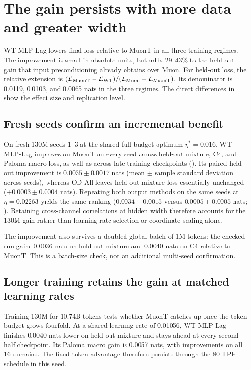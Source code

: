 \section{The gain persists with more data and greater width}
\label{sec:scaling}

WT-MLP-Lag lowers final loss relative to MuonT in all three training regimes. The improvement is small in absolute units, but adds 29--43\% to the held-out gain that input preconditioning already obtains over Muon. For held-out loss, the relative extension is $(\mathcal L_{\rm MuonT}-\mathcal L_{\rm WT})/(\mathcal L_{\rm Muon}-\mathcal L_{\rm MuonT})$. Its denominator is 0.0119, 0.0103, and 0.0065 nats in the three regimes. The direct differences in  show the effect size and replication level.



\subsection{Fresh seeds confirm an incremental benefit}
\label{sec:phase2}

On fresh 130M seeds 1--3 at the shared full-budget optimum $\eta^*=0.016$, WT-MLP-Lag improves on MuonT on every seed across held-out mixture, C4, and Paloma macro loss, as well as across late-training checkpoints (). Its paired held-out improvement is $0.0035\pm0.0017$ nats (mean $\pm$ sample standard deviation across seeds), whereas OD-All leaves held-out mixture loss essentially unchanged ($+0.0003\pm0.0004$ nats). Repeating both output methods on the same seeds at $\eta=0.02263$ yields the same ranking ($0.0034\pm0.0015$ versus $0.0005\pm0.0005$ nats; ). Retaining cross-channel correlations at hidden width therefore accounts for the 130M gain rather than learning-rate selection or coordinate scaling alone.

The improvement also survives a doubled global batch of 1M tokens: the checked run gains 0.0036 nats on held-out mixture and 0.0040 nats on C4 relative to MuonT. This is a batch-size check, not an additional multi-seed confirmation.

\subsection{Longer training retains the gain at matched learning rates}
\label{sec:phase3}

Training 130M for 10.74B tokens tests whether MuonT catches up once the token budget grows fourfold. At a shared learning rate of 0.01056, WT-MLP-Lag finishes 0.0040 nats lower on held-out mixture and stays ahead at every second-half checkpoint. Its Paloma macro gain is 0.0057 nats, with improvements on all 16 domains. The fixed-token advantage therefore persists through the 80-TPP schedule in this seed.

